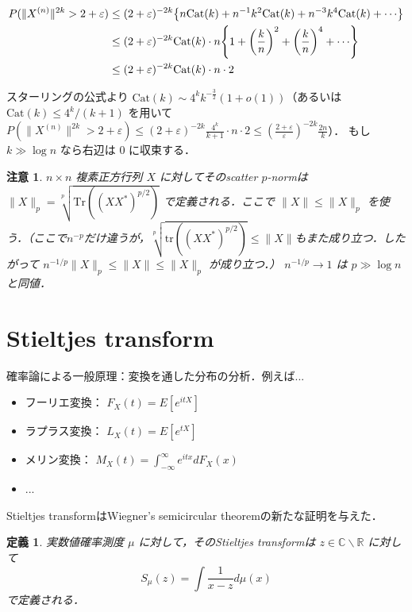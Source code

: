 \documentclass{ltjsarticle}
\theoremstyle{mystyle1}
\newtheorem{dfn}{定義}[section]
\theoremstyle{mystyle2}
\newtheorem{note*}{注意}
\theoremstyle{mystyle3}
\begin{document}
\begin{equation}
    \begin{split}
        P(\|X^{(n)}\|^{2k}>2+\varepsilon)
        &\leq (2+\varepsilon)^{-2k}\mleft\{n\mathrm{Cat}(k)+n^{-1}k^2\mathrm{Cat}(k)+n^{-3}k^4\mathrm{Cat}(k)+\cdots\mright\}\\
        &\leq (2+\varepsilon)^{-2k}\mathrm{Cat}(k)\cdot n\mleft\{1+\mleft(\frac{k}{n}\mright)^2+\mleft(\frac{k}{n}\mright)^4+\cdots\mright\}\\
        &\leq (2+\varepsilon)^{-2k}\mathrm{Cat}(k)\cdot n\cdot 2
    \end{split}
\end{equation}

スターリングの公式より $\mathrm{Cat}(k)\sim 4^k k^{-\frac{3}{2}}(1+o(1))$（あるいは $\mathrm{Cat}(k)\leq 4^k/(k+1)$ を用いて　$P(\|X^{(n)}\|^{2k}>2+\varepsilon)\leq (2+\varepsilon)^{-2k}\frac{4^k}{k+1}\cdot n\cdot 2\leq (\frac{2+\varepsilon}{\varepsilon})^{-2k}\frac{2n}{k}$）．
もし $k\gg\log n$ なら右辺は $0$ に収束する．

\begin{note*}
    $n\times n$ 複素正方行列 $X$ に対してそのscatter $p$-normは $\|X\|_p=\sqrt[p]{\mathrm{Tr}((XX^*)^{p/2})}$ で定義される．ここで $\|X\|\leq\|X\|_p$ を使う．（ここで$n^{-p}$だけ違うが，$\sqrt[p]{\mathrm{tr}((XX^*)^{p/2})}\leq\|X\|$もまた成り立つ．したがって $n^{-1/p}\|X\|_p\leq\|X\|\leq\|X\|_p$ が成り立つ．） $n^{-1/p}\to 1$ は $p\gg\log n$ と同値．
\end{note*}

\section{Stieltjes transform}

確率論による一般原理：変換を通した分布の分析．例えば...
\begin{itemize}
    \item フーリエ変換： $F_X(t)=E[e^{itX}]$
    \item ラプラス変換： $L_X(t)=E[e^{tX}]$
    \item メリン変換： $M_X(t)=\int_{-\infty}^{\infty}e^{itx}dF_X(x)$
    \item ...
\end{itemize}

Stieltjes transformはWiegner's semicircular theoremの新たな証明を与えた．

\begin{dfn}
    実数値確率測度 $\mu$ に対して，そのStieltjes transformは $z\in\mathbb{C}\backslash\mathbb{R}$ に対して
    \begin{equation}
        S_\mu(z)=\int\frac{1}{x-z}d\mu(x)
    \end{equation}
    で定義される．
\end{dfn}
\end{document}
